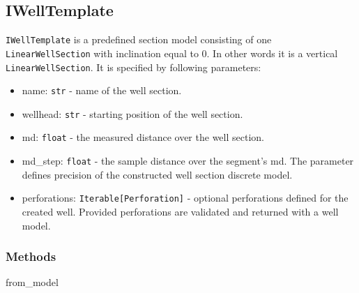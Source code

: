 	\subsection{IWellTemplate}
	\texttt{IWellTemplate} is a predefined section model consisting of one \texttt{LinearWellSection} with inclination equal to 0. In other words it is a vertical \texttt{LinearWellSection}. It is specified by following parameters:
	\begin{itemize}
		\item  \colorbox{gray!20}{name:} \texttt{str} - name of the well section.
		\item  \colorbox{gray!20}{wellhead:} \texttt{str} - starting position of the well section.
		\item  \colorbox{gray!20}{md:} \texttt{float} - the measured distance over the well section.
		\item  \colorbox{gray!20}{md\_step:} \texttt{float} - the sample distance over the segment's md. The parameter defines precision of the constructed well section discrete model.
		\item  \colorbox{gray!20}{perforations:} \texttt{Iterable[Perforation]} - optional perforations defined for the created well. Provided perforations are validated and returned with a well model.
	\end{itemize}
	\subsubsection{Methods}
	\begin{description}
		\item[\colorbox{gray!20}{from\_model}] \hfill
	\end{description}

